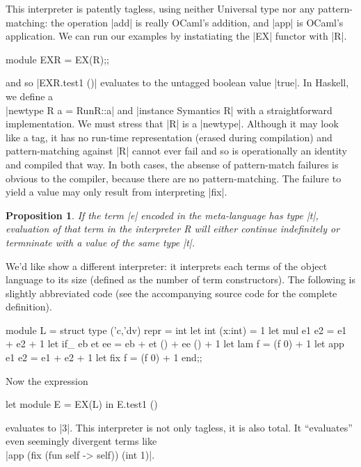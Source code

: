 \documentclass[preprint]{sigplanconf}
\newtheorem{prop}{Proposition}
\begin{document}
This interpreter is patently tagless, using neither Universal type nor
any pattern-matching: the operation |add| is really
OCaml's addition, and |app| is OCaml's application. We can run our
examples by instatiating the |EX| functor with |R|.
\noindent
\begin{code}
  module EXR = EX(R);;
\end{code}

\noindent and so |EXR.test1 ()| evaluates to the untagged boolean value |true|.
In Haskell, we define a\\
|newtype R a = R{unR::a}| and |instance Symantics R|
with a straightforward implementation. We must stress that |R| is
a |newtype|. Although it may look like a tag, it has no run-time
representation (erased during compilation) and pattern-matching
against |R| cannot ever fail and so is operationally an identity and
compiled that way. In both cases, the absense of pattern-match
failures is obvious to the compiler, because there are no
pattern-matching. The failure to yield a value
may only result from interpreting |fix|.

\begin{prop}
If the term |e| encoded in the meta-language has type
|t|, evaluation of that term in the interpreter R will either continue
indefinitely or termninate with a value of the same type |t|.
\end{prop}

We'd like show a different interpreter: it interprets each terms of
the object language to its size (defined as the number of term
constructors). The following is slightly abbreviated code (see the
accompanying source code for the complete definition).
 
\begin{code}
module L = struct
  type ('c,'dv) repr = int
  let int (x:int)  = 1
  let mul e1 e2    = e1 + e2 + 1
  let if_ eb et ee = eb + et () + ee () + 1
  let lam f        = (f 0) + 1
  let app e1 e2    = e1 + e2 + 1
  let fix f        = (f 0) + 1
end;;
\end{code}

\noindent Now the expression
\begin{code}
  let module E = EX(L) in E.test1 ()
\end{code}
evaluates to |3|. This interpreter is not only tagless, it is also
total. It ``evaluates'' even seemingly divergent terms like\\
|app (fix (fun self -> self)) (int 1)|.

\begin{comment}
module EX1(S: Symantics) = struct
 open S
 let tfix () = app (fix (fun self -> self)) (int 1)
end;;
let module E =EX1(R) in E.tfix ();;
let module E =EX1(L) in E.tfix ();;
\end{comment}
\end{document}
